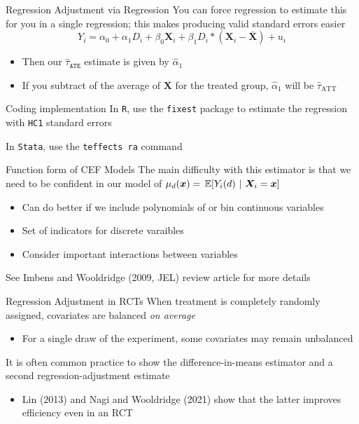 \documentclass[aspectratio=169,t,11pt,table]{beamer}
\begin{document}
\begin{frame}{Regression Adjustment via Regression}
  You can force regression to estimate this for you in a single regression; this makes producing valid standard errors easier
  $$
    Y_i = \alpha_0 + \alpha_1 D_i + \beta_0 \bm{X}_i + \beta_1 D_i * (\bm{X}_i - \bar{\bm{X}}) + u_i
  $$
  \begin{itemize}
    \item Then our $\hat{\tau}_{\texttt{ATE}}$ estimate is given by $\hat{\alpha}_1$
    \item If you subtract of the average of $\bm{X}$ for the treated group, $\hat{\alpha}_1$ will be $\hat{\tau}_{\text{ATT}}$
  \end{itemize}
\end{frame}

\begin{frame}{Coding implementation}
  In \texttt{R}, use the \texttt{fixest} package to estimate the regression with \texttt{HC1} standard errors

  \bigskip
  In \texttt{Stata}, use the \texttt{teffects ra} command
\end{frame}

\begin{frame}{Function form of CEF Models}
  The main difficulty with this estimator is that we need to be confident in our model of $\mu_d(\bm{x}) = \expec{Y_i(d)}{\bm{X}_i = \bm{x}}$
  \begin{itemize}
    \item Can do better if we include polynomials of or bin continuous variables 
    \item Set of indicators for discrete varaibles
    \item Consider important interactions between variables
  \end{itemize}

  \bigskip
  See Imbens and Wooldridge (2009, JEL) review article for more details
\end{frame}

\begin{frame}{Regression Adjustment in RCTs}
  When treatment is completely randomly assigned, covariates are balanced \emph{on average}
  \begin{itemize}
    \item For a single draw of the experiment, some covariates may remain unbalanced
  \end{itemize}

  \pause
  \bigskip
  It is often common practice to show the difference-in-means estimator and a second regression-adjustment estimate
  \begin{itemize}
    \item Lin (2013) and Nagi and Wooldridge (2021) show that the latter improves efficiency even in an RCT
  \end{itemize}
\end{frame}
\end{document}

